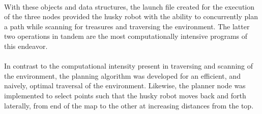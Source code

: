 \documentclass[12pt]{article}
\begin{document}
{  \paragraph{}With these objects and data structures, the launch file created for the execution of the three nodes provided the husky robot with the ability to concurrently plan a path while scanning for treasures and traversing the environment. The latter two operations in tandem are the most computationally intensive programs of this endeavor. 
  \paragraph{}In contrast to the computational intensity present in traversing and scanning of the environment, the planning algorithm was developed for an efficient, and naively, optimal traversal of the environment. Likewise, the planner node was implemented to select points such that the husky robot moves back and forth  laterally, from end of the map to the other at increasing distances from the top.      
  \\\\
}
\end{document}
